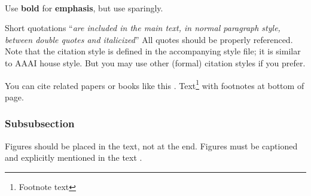 


\ \\ Use \textbf{bold} for \textbf{emphasis}, but use sparingly. 

Short quotations ``\textit{are included in the main text, in normal paragraph style, between double quotes and italicized}'' All quotes should be properly referenced. Note that the citation style is defined in the accompanying
style file; it is similar to AAAI house style. But you may use other (formal) citation styles if you prefer.

You can cite related papers or books like this \cite{bishop2006pattern}. Text\footnote{Footnote text} with footnotes at bottom of page.
\subsubsection{Subsubsection}

Figures should be placed in the text, not at the end. Figures must be captioned and explicitly mentioned in the text . 
